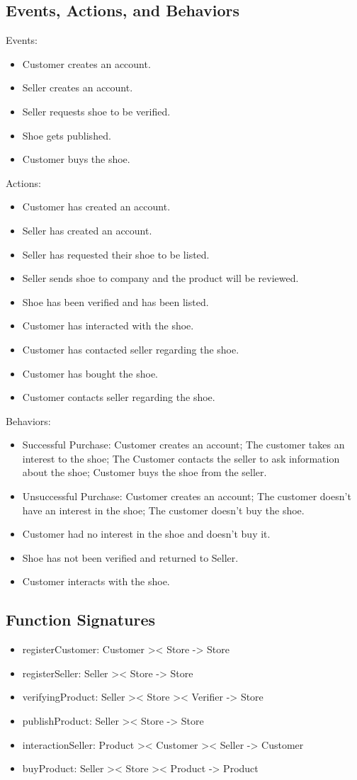 \subsection{Events, Actions, and Behaviors}
Events:
\begin{itemize}
  \item Customer creates an account.
  \item Seller creates an account.
  \item Seller requests shoe to be verified.
  \item Shoe gets published.
  \item Customer buys the shoe.
\end{itemize}
Actions:
\begin{itemize}
  \item Customer has created an account.
  \item Seller has created an account.
  \item Seller has requested their shoe to be listed.
  \item Seller sends shoe to company and the product will be reviewed.
  \item Shoe has been verified and has been listed.
  \item Customer has interacted with the shoe.
  \item Customer has contacted seller regarding the shoe.
  \item Customer has bought the shoe.
  \item Customer contacts seller regarding the shoe.
\end{itemize}
Behaviors:
\begin{itemize}
  \item Successful Purchase: Customer creates an account; The customer takes an interest to the shoe; The Customer contacts the seller to ask information about the shoe; Customer buys the shoe from the seller.
  \item Unsuccessful Purchase: Customer creates an account; The customer doesn't have an interest in the shoe; The customer doesn't buy the shoe.
  \item Customer had no interest in the shoe and doesn't buy it.
  \item Shoe has not been verified and returned to Seller.
  \item Customer interacts with the shoe.
\end{itemize}
\subsection{Function Signatures}
\begin{itemize}
  \item registerCustomer: Customer >< Store -> Store
  \item registerSeller: Seller >< Store -> Store
  \item verifyingProduct: Seller >< Store >< Verifier -> Store
  \item publishProduct: Seller >< Store -> Store
  \item interactionSeller: Product >< Customer >< Seller -> Customer
  \item buyProduct: Seller >< Store >< Product -> Product
\end{itemize}
